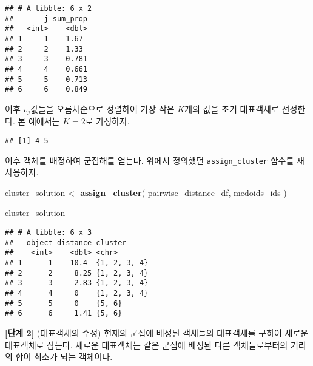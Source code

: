 \documentclass[]{book}
\newenvironment{Shaded}{\begin{snugshade}}{\end{snugshade}}
\newcommand{\DecValTok}[1]{\textcolor[rgb]{0.00,0.00,0.81}{#1}}
\newcommand{\KeywordTok}[1]{\textcolor[rgb]{0.13,0.29,0.53}{\textbf{#1}}}
\newcommand{\NormalTok}[1]{#1}
\newcommand{\OperatorTok}[1]{\textcolor[rgb]{0.81,0.36,0.00}{\textbf{#1}}}
\newcommand{\StringTok}[1]{\textcolor[rgb]{0.31,0.60,0.02}{#1}}
\begin{document}
\begin{verbatim}
## # A tibble: 6 x 2
##       j sum_prop
##   <int>    <dbl>
## 1     1    1.67 
## 2     2    1.33 
## 3     3    0.781
## 4     4    0.661
## 5     5    0.713
## 6     6    0.849
\end{verbatim}

이후 \(v_j\)값들을 오름차순으로 정렬하여 가장 작은 \(K\)개의 값을 초기 대표객체로 선정한다. 본 예에서는 \(K = 2\)로 가정하자.

\begin{Shaded}
\end{Shaded}

\begin{verbatim}
## [1] 4 5
\end{verbatim}

이후 객체를 배정하여 군집해를 얻는다. 위에서 정의했던 \texttt{assign\_cluster} 함수를 재사용하자.

\begin{Shaded}
\begin{Highlighting}[]
\NormalTok{cluster_solution <-}\StringTok{ }\KeywordTok{assign_cluster}\NormalTok{(}
\NormalTok{  pairwise_distance_df, }
\NormalTok{  medoids_ids}
\NormalTok{  )}

\NormalTok{cluster_solution}
\end{Highlighting}
\end{Shaded}

\begin{verbatim}
## # A tibble: 6 x 3
##   object distance cluster     
##    <int>    <dbl> <chr>       
## 1      1    10.4  {1, 2, 3, 4}
## 2      2     8.25 {1, 2, 3, 4}
## 3      3     2.83 {1, 2, 3, 4}
## 4      4     0    {1, 2, 3, 4}
## 5      5     0    {5, 6}      
## 6      6     1.41 {5, 6}
\end{verbatim}

\textbf{{[}단계 2{]}} (대표객체의 수정) 현재의 군집에 배정된 객체들의 대표객체를 구하여 새로운 대표객체로 삼는다. 새로운 대표객체는 같은 군집에 배정된 다른 객체들로부터의 거리의 합이 최소가 되는 객체이다.
\end{document}
